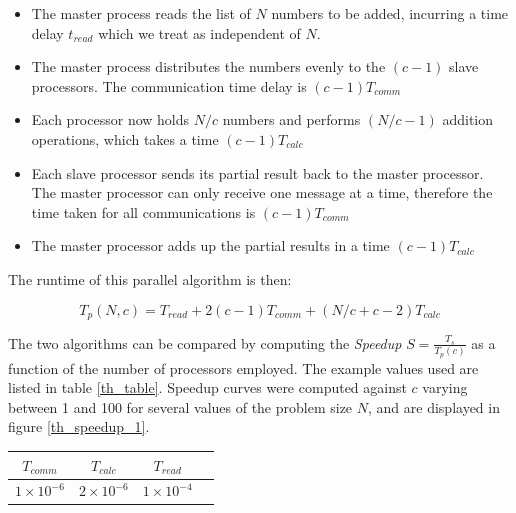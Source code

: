 \documentclass{article}
\begin{document}
\begin{itemize}
\item The master process reads the list of $N$ numbers to be added, incurring a time delay $t_{read}$ which we treat as independent of $N$.
\item The master process distributes the numbers evenly to the $\left( c - 1 \right) $ slave processors. The communication time delay is $\left( c - 1\right) T_{comm}$
\item Each processor now holds $N/c$ numbers and performs $\left( N/c - 1 \right)$ addition operations, which takes a time $\left( c - 1 \right)T_{calc}$
\item Each slave processor sends its partial result back to the master processor. The master processor can only receive one message at a time, therefore the time taken for all communications is $\left( c - 1\right) T_{comm}$
\item The master processor adds up the partial results in a time  $\left( c - 1\right) T_{calc}$
\end{itemize}

The runtime of this parallel algorithm is then:

\begin{equation}
T_p \left( N, c \right) = T_{read} + 2\left( c - 1 \right)T_{comm}  +  \left( N/c + c - 2 \right)T_{calc}
\end{equation}

The two algorithms can be compared by computing the \textit{Speedup} $S = \frac{T_s}{T_p\left( c \right)}$ as a function of the number of processors employed. The example values used are listed in table \ref{th_table}. Speedup curves were computed against $c$ varying between 1 and 100 for several values of the problem size $N$, and are displayed in figure \ref{th_speedup_1}.

\begin{center}
\label{th_table}
 \begin{tabular}{|c | c | c | c|} 
 \hline
 $T_{comm}$ & $T_{calc}$ & $T_{read}$ \\ 
 \hline
 $1 \times 10^{-6} $ & $2 \times 10^{-6}$ & $1 \times 10^{-4}$\\ 
 \hline
\end{tabular}
\end{center}
\end{document}
